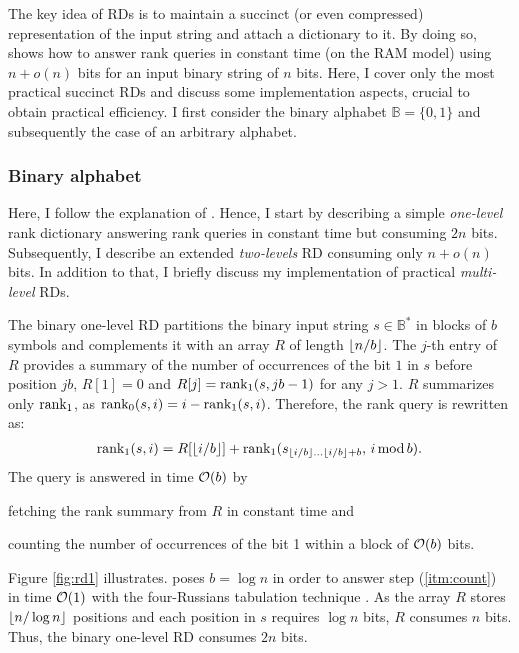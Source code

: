 The key idea of RDs is to maintain a succinct (or even compressed) representation of the input string and attach a dictionary to it.
By doing so, \cite{Jacobson1989} shows how to answer rank queries in constant time (on the RAM model) using $n+o(n)$ bits for an input binary string of $n$ bits.
Here, I cover only the most practical succinct RDs and discuss some implementation aspects, crucial to obtain practical efficiency.
I first consider the binary alphabet $\mathbb{B} = \{ 0, 1 \}$ and subsequently the case of an arbitrary alphabet.

\subsubsection{Binary alphabet}
\label{sec:index:rd:binary}

Here, I follow the explanation of \citep{Navarro2007}.
Hence, I start by describing a simple \emph{one-level} rank dictionary answering rank queries in constant time but consuming $2n$ bits.
Subsequently, I describe an extended \emph{two-levels} RD consuming only $n + o(n)$ bits.
In addition to that, I briefly discuss my implementation of practical \emph{multi-level} RDs.

The binary one-level RD partitions the binary input string $s \in \mathbb{B}^*$ in blocks of $b$ symbols and
complements it with an array $R$ of length $\left \lfloor n/b \right \rfloor$.
The $j$-th entry of $R$ provides a summary of the number of occurrences of the bit $1$ in $s$ before position $j b$, \ie $R[1] = 0$ and $R[j] = \text{rank}_1(s, j b - 1)$ for any $j > 1$.
$R$ summarizes only $\text{rank}_1$, as $\text{rank}_0(s, i) = i - \text{rank}_1(s, i)$.
Therefore, the rank query is rewritten as:
\begin{eqnarray}
\rank_1(s,i) = R[\xfloor{i/b}] + \rank_1(s_{\xfloor{i/b} \dots \xfloor{i/b}+b}, \, i \imod{b}).
\end{eqnarray}
The query is answered in time $\mathcal{O}(b)$ by 
\begin{inparaenum}[(i)]
\item \label{itm:fetch} fetching the rank summary from $R$ in constant time and
\item \label{itm:count} counting the number of occurrences of the bit 1 within a block of $\mathcal{O}(b)$ bits.
\end{inparaenum}
Figure \ref{fig:rd1} illustrates.
\citeauthor{Jacobson1989} poses $b=\log{n}$ in order to answer step (\ref{itm:count}) in time $\mathcal{O}(1)$ with the four-Russians tabulation technique \citep{Arlazarov1970}.
As the array $R$ stores $\left \lfloor n/\log{n} \right \rfloor$ positions and each position in $s$ requires $\log{n}$ bits, $R$ consumes $n$ bits.
Thus, the binary one-level RD consumes $2n$ bits.

